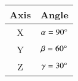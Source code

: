 \begin{tabular}[12pt]{ |c|c|}
    \hline
        \textbf{Axis} & \textbf{Angle} \\
    \hline
        X & $\alpha=90\degree$ \\
    \hline 
        Y & $\beta=60\degree$ \\
    \hline 
    Z & $\gamma=30\degree$\\
    \hline
\end{tabular}
